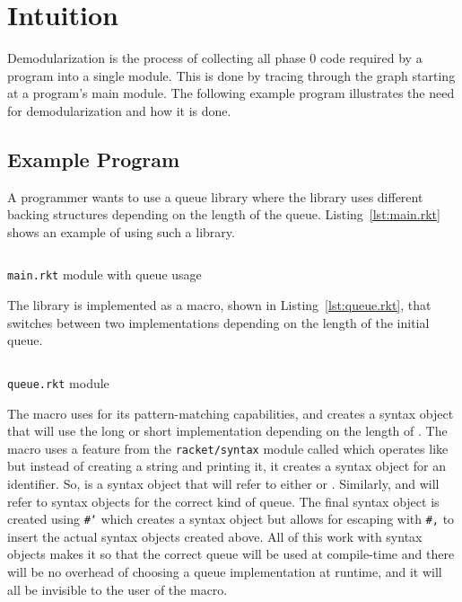 \chapter{Intuition}
\label{chap:intuition}
Demodularization is the process of collecting all phase 0 code required by a program into a single module.
This is done by tracing through the  graph starting at a program's main module.
The following example program illustrates the need for demodularization and how it is done.

\section{Example Program}
A programmer wants to use a queue library where the library uses different backing structures depending on the length of the queue. 
Listing~\ref{lst:main.rkt} shows an example of using such a library.
\begin{listing}
  \inputminted{racket}{listings/main.rkt}
  \caption{\texttt{main.rkt} module with queue usage}
  \label{lst:main.rkt}
\end{listing}
The library is implemented as a macro, shown in Listing~\ref{lst:queue.rkt}, that switches between two implementations depending on the length of the initial queue.

\begin{listing}
  \inputminted{racket}{listings/queue.rkt}
  \caption{\texttt{queue.rkt} module}
  \label{lst:queue.rkt}
\end{listing}

The macro  uses  for its pattern-matching capabilities, and creates a syntax object that will use the long or short implementation depending on the length of . 
The macro uses a feature from the \texttt{racket/syntax} module called  which operates like  but instead of creating a string and printing it, it creates a syntax object for an identifier. 
So,  is a syntax object that will refer to either  or .
Similarly,  and  will refer to syntax objects for the correct kind of queue.
The final syntax object is created using \texttt{#`} which creates a syntax object but allows for escaping with \texttt{#,} to insert the actual syntax objects created above.
All of this work with syntax objects makes it so that the correct queue will be used at compile-time and there will be no overhead of choosing a queue implementation at runtime, and it will all be invisible to the user of the  macro.

